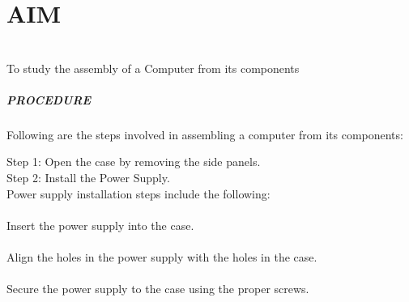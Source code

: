 \documentclass[12pt]{article}
\begin{document}
\renewcommand{\abstractname}{\Large AIM}
\chapter{AIM} \vspace{0.5cm}
\\To study the assembly of a Computer from its components \vspace{0.5cm}
\paragraph{PROCEDURE\\}
Following are the steps involved in assembling a computer from its components:

{Step 1}: Open the case by removing the side panels.\\

{Step 2}: Install the Power Supply.\\

Power supply installation steps include the following:\\

\\Insert the power supply into the case.\\
\\Align the holes in the power supply with the holes in the case.\\
\\Secure the power supply to the case using the proper screws.\\
\end{document}
